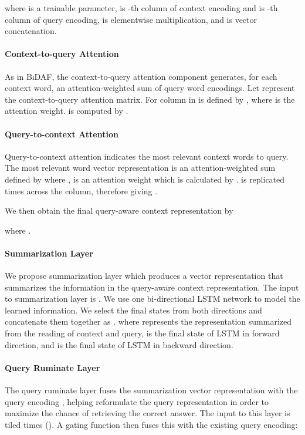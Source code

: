 \documentclass[11pt,letterpaper]{article}
\begin{document}
where  is a trainable parameter,  is -th column of context encoding and  is -th column of query encoding,  is elementwise multiplication, and  is vector concatenation.  

\paragraph{Context-to-query Attention}  As in \textsc{BiDAF}, the context-to-query attention component generates, for each context word, an attention-weighted sum of query word encodings. Let  represent the context-to-query attention matrix. For column  in  is defined by , where  is the attention weight.  is computed by . 

\paragraph{Query-to-context Attention} Query-to-context attention indicates the most relevant context words to query. The most relevant word vector representation is an attention-weighted sum defined by  where , is an attention weight which is calculated by .  is replicated  times across the column, therefore giving .


We then obtain the final query-aware context representation by 

where .



\paragraph{Summarization Layer} We propose summarization layer which produces a vector representation that summarizes the information in the query-aware context representation. The input to summarization layer is . We use one bi-directional LSTM network to model the learned information. We select the final states from both directions and concatenate them together as  . where  represents the representation summarized from the reading of context and query,  is the final state of LSTM in forward direction, and  is the final state of LSTM in backward direction. 

\paragraph{Query Ruminate Layer} The query ruminate layer fuses the summarization vector representation with the query encoding , helping reformulate the query representation in order to maximize the chance of retrieving the correct answer. The input to this layer is  tiled  times (). A gating function then fuses this with the existing query encoding:
\end{document}
